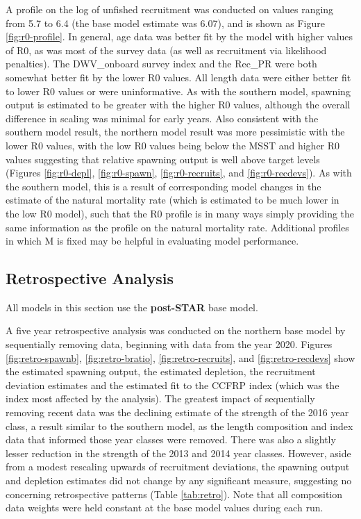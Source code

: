 \documentclass[
  english,
  a4paper,
]{article}
\begin{document}
A profile on the log of unfished recruitment was conducted on values ranging from 5.7 to 6.4 (the base model estimate was 6.07), and is shown as Figure \ref{fig:r0-profile}. In general, age data was better fit by the model with higher values of R0, as was most of the survey data (as well as recruitment via likelihood penalties). The DWV\_onboard survey index and the Rec\_PR were both somewhat better fit by the lower R0 values. All length data were either better fit to lower R0 values or were uninformative. As with the southern model, spawning output is estimated to be greater with the higher R0 values, although the overall difference in scaling was minimal for early years. Also consistent with the southern model result, the northern model result was more pessimistic with the lower R0 values, with the low R0 values being below the MSST and higher R0 values suggesting that relative spawning output is well above target levels (Figures \ref{fig:r0-depl}, \ref{fig:r0-spawn}, \ref{fig:r0-recruits}, and \ref{fig:r0-recdevs}). As with the southern model, this is a result of corresponding model changes in the estimate of the natural mortality rate (which is estimated to be much lower in the low R0 model), such that the R0 profile is in many ways simply providing the same information as the profile on the natural mortality rate. Additional profiles in which M is fixed may be helpful in evaluating model performance.

\hypertarget{retrospective-analysis}{%
\subsection{Retrospective Analysis}\label{retrospective-analysis}}

All models in this section use the \textbf{post-STAR} base model.

A five year retrospective analysis was conducted on the northern base model by sequentially removing data, beginning with data from the year 2020. Figures \ref{fig:retro-spawnb}, \ref{fig:retro-bratio}, \ref{fig:retro-recruits}, and \ref{fig:retro-recdevs} show the estimated spawning output, the estimated depletion, the recruitment deviation estimates and the estimated fit to the CCFRP index (which was the index most affected by the analysis). The greatest impact of sequentially removing recent data was the declining estimate of the strength of the 2016 year class, a result similar to the southern model, as the length composition and index data that informed those year classes were removed. There was also a slightly lesser reduction in the strength of the 2013 and 2014 year classes. However, aside from a modest rescaling upwards of recruitment deviations, the spawning output and depletion estimates did not change by any significant measure, suggesting no concerning retrospective patterns (Table \ref{tab:retro}). Note that all composition data weights were held constant at the base model values during each run.
\end{document}
